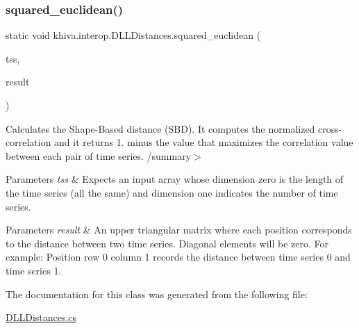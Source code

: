 \subsubsection{\texorpdfstring{squared\+\_\+euclidean()}{squared\_euclidean()}}
{\footnotesize\ttfamily static void khiva.\+interop.\+D\+L\+L\+Distances.\+squared\+\_\+euclidean (\begin{DoxyParamCaption}\item[{\mbox{[}\+In\mbox{]} ref Int\+Ptr}]{tss,  }\item[{\mbox{[}\+Out\mbox{]} out Int\+Ptr}]{result }\end{DoxyParamCaption})\hspace{0.3cm}{\ttfamily [static]}}



Calculates the Shape-\/\+Based distance (S\+BD). It computes the normalized cross-\/correlation and it returns 1. minus the value that maximizes the correlation value between each pair of time series. /summary$>$ 
\begin{DoxyParams}{Parameters}
{\em tss} & Expects an input array whose dimension zero is the length of the time series (all the same) and dimension one indicates the number of time series.\\
\hline
\end{DoxyParams}



\begin{DoxyParams}{Parameters}
{\em result} & An upper triangular matrix where each position corresponds to the distance between two time series. Diagonal elements will be zero. For example\+: Position row 0 column 1 records the distance between time series 0 and time series 1.\\
\hline
\end{DoxyParams}


The documentation for this class was generated from the following file\+:\begin{DoxyCompactItemize}
\item 
\mbox{\hyperlink{_d_l_l_distances_8cs}{D\+L\+L\+Distances.\+cs}}\end{DoxyCompactItemize}
